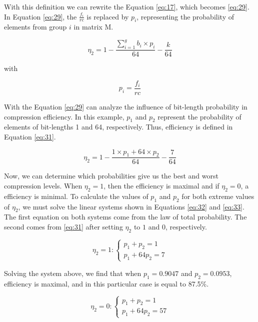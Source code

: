 \documentclass[10pt]{article}
\begin{document}
With this definition we can rewrite the Equation \ref{eq:17}, which becomes \ref{eq:29}. In Equation \ref{eq:29}, the $\frac{f_i}{rc}$ is replaced by $p_i$, representing the probability of elements from group $i$ in matrix M.

\begin{equation}\label{eq:29}
 \eta_2 = 1 - \frac{\sum_{i=1}^{g}  b_i \times p_i }{64} - \frac{k}{64} 
\end{equation}

\noindent with

\begin{equation}\label{eq:30}
 p_i = \frac{f_i}{rc}
\end{equation}

With the Equation \ref{eq:29} can analyze the influence of bit-length probability in compression efficiency. In this example, $p_1$ and $p_2$ represent the probability of elements of bit-lengths 1 and 64, respectively. Thus, efficiency is defined in Equation \ref{eq:31}.

\begin{equation}\label{eq:31}
 \eta_2 = 1 - \frac{1 \times p_1  + 64 \times p_2}{64} - \frac{7}{64} 
\end{equation}

Now, we can determine which probabilities give us the best and worst compression levels. When $\eta_2=1$, then the efficiency is maximal and if $\eta_2=0$, a efficiency is minimal. To calculate the values ​​of $p_1$ and $p_2$ for both extreme values of $\eta_2$,  we must solve the linear systems shown in Equations \ref{eq:32} and \ref{eq:33}. The first equation on both systems come from the law of total probability. The second comes from \ref{eq:31} after setting $\eta_2$ to $1$ and $0$, respectively.

\begin{equation}\label{eq:32}
  \eta_2 = 1 :\left
  \{\begin{matrix}
    p_1 + p_2 = 1\\ 
    p_1+64p_2 = 7
  \end{matrix}
  \right.
\end{equation}

Solving the system above, we find that  when $p_1=0.9047$ and $p_2=0.0953$, efficiency is maximal, and in this particular case is equal to 87.5\%. 

\begin{equation}\label{eq:33}
  \eta_2 = 0 :\left
  \{\begin{matrix}
    p_1 + p_2 = 1\\ 
    p_1+64p_2 = 57
  \end{matrix}
  \right.
\end{equation}
\end{document}
